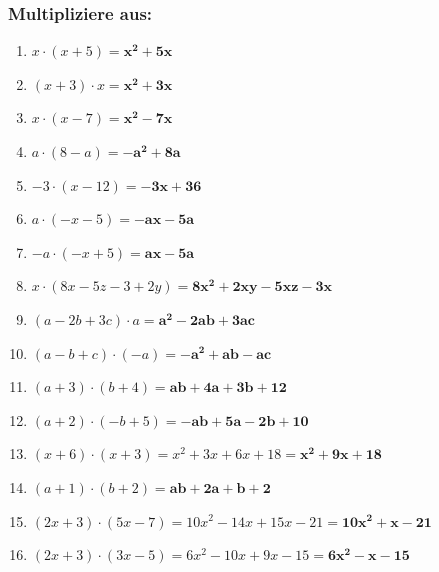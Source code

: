 \documentclass[a4paper,12pt]{article} %
\begin{document}
\subsubsection{Multipliziere aus:} %

\begin{enumerate}[label=\alph*)]

  \item \(x \cdot (x + 5) = \mathbf{x^2 + 5x}\) %

  \item \((x + 3) \cdot x = \mathbf{x^2 + 3x}\) %

  \item \(x \cdot (x - 7) = \mathbf{x^2 - 7x}\) %

  \item \(a \cdot (8 - a) = \mathbf{-a^2 + 8a}\) %

  \item \(-3 \cdot (x - 12) = \mathbf{-3x + 36}\) %

  \item \(a \cdot (-x - 5) = \mathbf{-ax - 5a}\) %

  \item \(-a \cdot (-x + 5) = \mathbf{ax - 5a}\) %

  \item \(x \cdot (8x - 5z - 3 + 2y) = \mathbf{8x^2 + 2xy - 5xz - 3x}\) %

  \item \((a - 2b + 3c) \cdot a = \mathbf{a^2 - 2ab + 3ac}\) %

  \item \((a - b + c) \cdot (-a) = \mathbf{-a^2 + ab - ac}\) %

  \item \((a + 3) \cdot (b + 4) = \mathbf{ab + 4a + 3b + 12}\) %

  \item \((a + 2) \cdot (-b + 5) = \mathbf{-ab + 5a - 2b + 10}\) %

  \item \((x + 6) \cdot (x + 3) = x^2 + 3x + 6x + 18 = \mathbf{x^2 + 9x + 18}\) %

  \item \((a + 1) \cdot (b + 2) = \mathbf{ab + 2a + b + 2}\) %

  \item \((2x + 3) \cdot (5x - 7) = 10x^2 - 14x + 15x - 21 = \mathbf{10x^2 + x - 21}\) %

  \item \((2x + 3) \cdot (3x - 5) = 6x^2 - 10x + 9x - 15 = \mathbf{6x^2 - x - 15} \) %

\end{enumerate}
\end{document}
